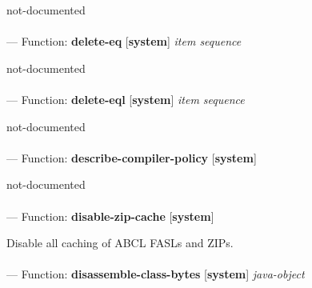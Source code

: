 \begin{adjustwidth}{5em}{5em}
not-documented
\end{adjustwidth}

\paragraph{}
\label{SYSTEM:DELETE-EQ}
--- Function: \textbf{delete-eq} [\textbf{system}] \textit{item sequence}

\begin{adjustwidth}{5em}{5em}
not-documented
\end{adjustwidth}

\paragraph{}
\label{SYSTEM:DELETE-EQL}
--- Function: \textbf{delete-eql} [\textbf{system}] \textit{item sequence}

\begin{adjustwidth}{5em}{5em}
not-documented
\end{adjustwidth}

\paragraph{}
\label{SYSTEM:DESCRIBE-COMPILER-POLICY}
--- Function: \textbf{describe-compiler-policy} [\textbf{system}] \textit{}

\begin{adjustwidth}{5em}{5em}
not-documented
\end{adjustwidth}

\paragraph{}
\label{SYSTEM:DISABLE-ZIP-CACHE}
--- Function: \textbf{disable-zip-cache} [\textbf{system}] \textit{}

\begin{adjustwidth}{5em}{5em}
Disable all caching of ABCL FASLs and ZIPs.
\end{adjustwidth}

\paragraph{}
\label{SYSTEM:DISASSEMBLE-CLASS-BYTES}
--- Function: \textbf{disassemble-class-bytes} [\textbf{system}] \textit{java-object}

